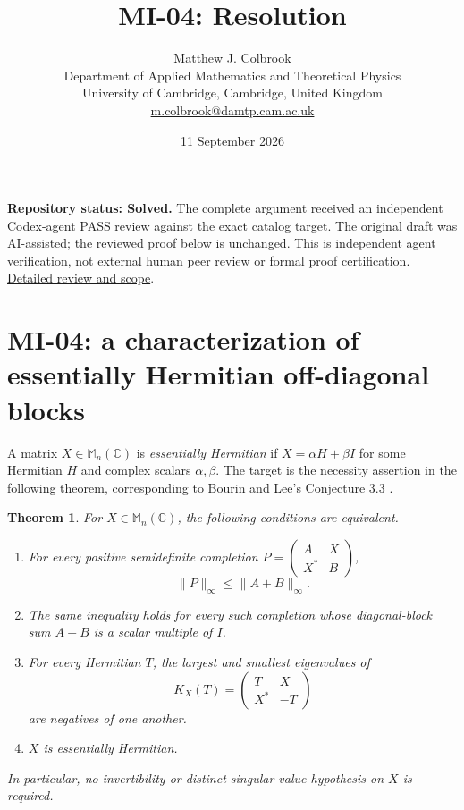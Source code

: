 \documentclass[10pt,a4paper]{article}
\title{MI-04: Resolution}
\author{Matthew J. Colbrook\\
\small Department of Applied Mathematics and Theoretical Physics\\
\small University of Cambridge, Cambridge, United Kingdom\\
\small\href{mailto:m.colbrook@damtp.cam.ac.uk}{m.colbrook@damtp.cam.ac.uk}}
\date{11 September 2026}
\newtheorem{theorem}{Theorem}[section]
\theoremstyle{remark}
\newcommand{\M}{\mathbb M}
\newcommand{\C}{\mathbb C}
\newcommand{\opnorm}[1]{\lVert #1\rVert_{\infty}}
\begin{document}
\maketitle
\textbf{Repository status: Solved.}
The complete argument received an independent Codex-agent PASS review
against the exact catalog target.
The original draft was AI-assisted; the reviewed proof below is unchanged.
This is independent agent verification, not external human peer review or
formal proof certification. \href{https://github.com/ajt60gaibb/OpenProblemsInNLA/blob/main/references/colbrook-matrix-2026-09-11/verification/reviews/MI-04-review.md}{Detailed review and scope}.
\par\medskip
\section{MI-04: a characterization of essentially Hermitian off-diagonal blocks}
\label{sec:mi04}

A matrix $X\in\M_n(\C)$ is \emph{essentially Hermitian} if
$X=\alpha H+\beta I$ for some Hermitian $H$ and complex scalars $\alpha,\beta$.
The target is the necessity assertion in the following theorem, corresponding to Bourin and Lee's Conjecture 3.3 \cite{BL2021}.

\begin{theorem}\label{thm:mi04}
For $X\in\M_n(\C)$, the following conditions are equivalent.
\begin{enumerate}
\item For every positive semidefinite completion
$P=\begin{pmatrix}A&X\\X^*&B\end{pmatrix}$,
\[
 \opnorm{P}\leq\opnorm{A+B}.
\]
\item The same inequality holds for every such completion whose diagonal-block sum $A+B$ is a scalar multiple of $I$.
\item For every Hermitian $T$, the largest and smallest eigenvalues of
\[
 K_X(T)=\begin{pmatrix}T&X\\X^*&-T\end{pmatrix}
\]
are negatives of one another.
\item $X$ is essentially Hermitian.
\end{enumerate}
In particular, no invertibility or distinct-singular-value hypothesis on $X$ is required.
\end{theorem}
\end{document}
